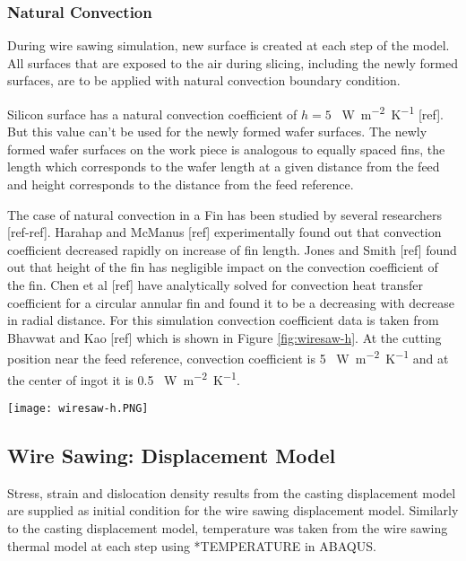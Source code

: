 \subsubsection{Natural Convection}
During wire sawing simulation, new surface is created at each step of the model. All surfaces that are exposed to the air during slicing, including the newly formed surfaces, are to be applied with natural convection boundary condition. 

Silicon surface has a natural convection coefficient of $h = 5$ \SI{}{W.m^{-2}.K^{-1}} [ref]. But this value can’t be used for the newly formed wafer surfaces. The newly formed wafer surfaces on the work piece is analogous to equally spaced fins, the length which corresponds to the wafer length at a given distance from the feed and height corresponds to the distance from the feed reference. 

The case of natural convection in a Fin has been studied by several researchers [ref-ref]. Harahap and McManus [ref] experimentally found out that convection coefficient decreased rapidly on increase of fin length. Jones and Smith [ref] found out that height of the fin has negligible impact on the convection coefficient of the fin. Chen et al [ref] have analytically solved for convection heat transfer coefficient for a circular annular fin and found it to be a decreasing with decrease in radial distance. For this simulation convection coefficient data is taken from Bhavwat and Kao [ref] which is shown in Figure \ref{fig:wiresaw-h}.  At the cutting position near the feed reference, convection coefficient is 5 \SI{}{W.m^{-2}.K^{-1}} and at the center of ingot it is 0.5 \SI{}{W.m^{-2}.K^{-1}}.

\noindent
\begin{minipage}[c]{\textwidth}
\centering
        \captionsetup{type=figure}
        \texttt{[image: wiresaw-h.PNG]}
        \label{fig:wiresaw-h}
\end{minipage}

\subsection{Wire Sawing: Displacement Model}

Stress, strain and dislocation density results from the casting displacement model are supplied as initial condition for the wire sawing displacement model. Similarly to the casting displacement model, temperature was taken from the wire sawing thermal model at each step using *TEMPERATURE in ABAQUS.  

